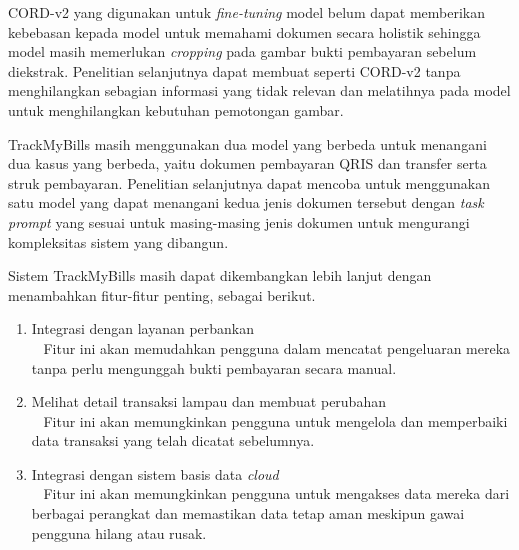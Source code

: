 \datasetfl{} CORD-v2 yang digunakan untuk \emph{fine-tuning} model \donut{} belum dapat memberikan kebebasan kepada model untuk memahami dokumen secara holistik sehingga model masih memerlukan \emph{cropping} pada gambar bukti pembayaran sebelum diekstrak. Penelitian selanjutnya dapat membuat \dataset{} seperti CORD-v2 tanpa menghilangkan sebagian informasi yang tidak relevan dan melatihnya pada model \donut{} untuk menghilangkan kebutuhan pemotongan gambar.

TrackMyBills masih menggunakan dua model yang berbeda untuk menangani dua kasus yang berbeda, yaitu dokumen pembayaran QRIS dan transfer serta struk pembayaran. Penelitian selanjutnya dapat mencoba untuk menggunakan satu model yang dapat menangani kedua jenis dokumen tersebut dengan \emph{task prompt} yang sesuai untuk masing-masing jenis dokumen untuk mengurangi kompleksitas sistem yang dibangun.

Sistem TrackMyBills masih dapat dikembangkan lebih lanjut dengan menambahkan fitur-fitur penting, sebagai berikut.
\begin{enumerate}
    \item Integrasi dengan layanan perbankan\\~ Fitur ini akan memudahkan pengguna dalam mencatat pengeluaran mereka tanpa perlu mengunggah bukti pembayaran secara manual.
    \item Melihat detail transaksi lampau dan membuat perubahan\\~ Fitur ini akan memungkinkan pengguna untuk mengelola dan memperbaiki data transaksi yang telah dicatat sebelumnya.
    \item Integrasi dengan sistem basis data \emph{cloud}\\~
    Fitur ini akan memungkinkan pengguna untuk mengakses data mereka dari berbagai perangkat dan memastikan data tetap aman meskipun gawai pengguna hilang atau rusak.
\end{enumerate}